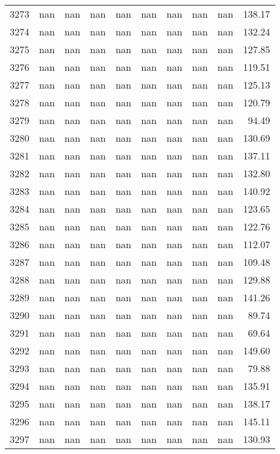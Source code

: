 \begin{tabular}{lrrrrrrrrr}
3273 & nan & nan & nan & nan & nan & nan & nan & nan & 138.17 \\
3274 & nan & nan & nan & nan & nan & nan & nan & nan & 132.24 \\
3275 & nan & nan & nan & nan & nan & nan & nan & nan & 127.85 \\
3276 & nan & nan & nan & nan & nan & nan & nan & nan & 119.51 \\
3277 & nan & nan & nan & nan & nan & nan & nan & nan & 125.13 \\
3278 & nan & nan & nan & nan & nan & nan & nan & nan & 120.79 \\
3279 & nan & nan & nan & nan & nan & nan & nan & nan & 94.49 \\
3280 & nan & nan & nan & nan & nan & nan & nan & nan & 130.69 \\
3281 & nan & nan & nan & nan & nan & nan & nan & nan & 137.11 \\
3282 & nan & nan & nan & nan & nan & nan & nan & nan & 132.80 \\
3283 & nan & nan & nan & nan & nan & nan & nan & nan & 140.92 \\
3284 & nan & nan & nan & nan & nan & nan & nan & nan & 123.65 \\
3285 & nan & nan & nan & nan & nan & nan & nan & nan & 122.76 \\
3286 & nan & nan & nan & nan & nan & nan & nan & nan & 112.07 \\
3287 & nan & nan & nan & nan & nan & nan & nan & nan & 109.48 \\
3288 & nan & nan & nan & nan & nan & nan & nan & nan & 129.88 \\
3289 & nan & nan & nan & nan & nan & nan & nan & nan & 141.26 \\
3290 & nan & nan & nan & nan & nan & nan & nan & nan & 89.74 \\
3291 & nan & nan & nan & nan & nan & nan & nan & nan & 69.64 \\
3292 & nan & nan & nan & nan & nan & nan & nan & nan & 149.60 \\
3293 & nan & nan & nan & nan & nan & nan & nan & nan & 79.88 \\
3294 & nan & nan & nan & nan & nan & nan & nan & nan & 135.91 \\
3295 & nan & nan & nan & nan & nan & nan & nan & nan & 138.17 \\
3296 & nan & nan & nan & nan & nan & nan & nan & nan & 145.11 \\
3297 & nan & nan & nan & nan & nan & nan & nan & nan & 130.93 \\

\end{tabular}
